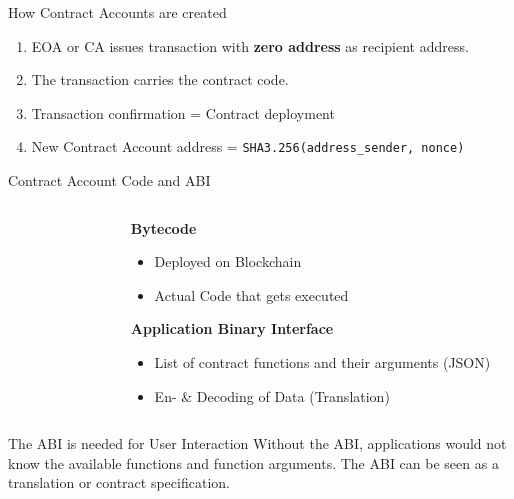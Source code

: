 \documentclass[handout]{beamer}
\begin{document}
\begin{frame}{How Contract Accounts are created}

\begin{enumerate}
				\item<1-> EOA or CA issues transaction with \textbf{zero address} as recipient address.
				\vspace{1em}
				\item<2-> The transaction carries the contract code.
				\item<3-> Transaction confirmation = Contract deployment
				\item<4-> New Contract Account address = \texttt{SHA3.256(address\_sender, nonce)} %
\end{enumerate}
			
\end{frame}


\begin{frame}{Contract Account Code and ABI}
	\begin{columns}[T]
		\begin{column}{0.6\textwidth}
			\begin{figure}[h!]
				\center
					
			\end{figure}\vspace{1em}
		\end{column}
		\begin{column}{0.5\textwidth}
			\textbf{Bytecode}
				\begin{itemize}
					\item Deployed on Blockchain
					\item Actual Code that gets executed
				\end{itemize}
		\vspace{2em}
			\textbf{Application Binary Interface}
				\begin{itemize}
					\item List of contract functions and their arguments (JSON)
					\item En- \& Decoding of Data (Translation) 
				\end{itemize}
		\end{column}
	\end{columns}
\vspace{1em}
	\begin{keytakeaway}{The ABI is needed for User Interaction}
		 Without the ABI, applications would not know the available functions and function arguments. The ABI can be seen as a translation or contract specification.
	\end{keytakeaway}		
\end{frame}
\end{document}
